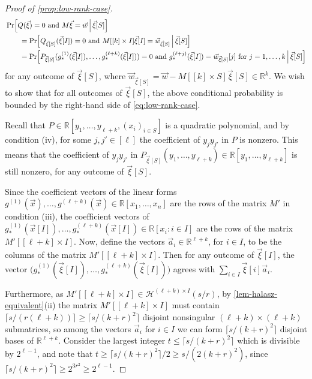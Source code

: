 \documentclass[english]{article}
\theoremstyle{remark}
\numberwithin{equation}{section}
\numberwithin{figure}{section}
\newcommand{\RR}{\mathbb{R}}
\begin{document}
\begin{proof}[Proof of \cref{prop:low-rank-case}]
\begin{align*}
&\Pr\Bigl[Q(\vec \xi)=0\text{ and }M\vec{\xi}=\vec{w}\,\Big|\,\vec \xi[S]\Bigr]\\
&\qquad =\Pr\Bigl[Q_{\vec \xi[S]}(\vec \xi[I])=0\text{ and }M[[k]\times I]\vec{\xi}[I]=\vec{w}_{\vec \xi[S]}\,\Big|\,\vec \xi[S]\Bigr]\\
&\qquad =\Pr\Bigl[P_{\vec \xi[S]}(g^{(1)}_{*}(\vec{\xi}[I]),\dots,g^{({\ell+k})}_{*}(\vec{\xi}[I]))=0\text{ and }g^{({\ell+j})}_{*}(\vec{\xi}[I])=\vec{w}_{\vec \xi[S]}[j]\text{ for }j=1,\dots,k\,\Big|\,\vec \xi[S]\Bigr]
\end{align*}
for any outcome of $\vec \xi[S]$, where $\vec{w}_{\vec \xi[S]}=\vec{w}-M[[k]\times S]\vec{\xi}[S]\in \RR^k$.
We wish to show that for all outcomes of $\vec \xi[S]$, the above conditional probability is bounded by the right-hand side of \cref{eq:low-rank-case}.

Recall that $P\in \mathbb{R}[y_1,\dots,y_{\ell+k}, (x_i)_{i\in S}]$ is a quadratic polynomial, and by condition (iv), for some $j,j'\in [\ell]$ the coefficient of $y_j y_{j'}$ in $P$ is nonzero. This means that the coefficient of $y_jy_{j'}$ in $P_{\vec \xi[S]}(y_1,\dots,y_{\ell+k})\in \mathbb{R}[y_1,\dots,y_{\ell+k}]$ is still nonzero, for any outcome of $\vec \xi[S]$.

Since the coefficient vectors of the linear forms $g^{(1)}(\vec x),\dots,g^{({\ell+k})}(\vec x)\in \RR[x_1,\dots,x_n]$ are the rows of the matrix $M'$ in condition (iii), the coefficient vectors of $g^{(1)}_{*}(\vec x[I]),\dots,g^{({\ell+k})}_{*}(\vec x[I])\in \RR[x_i: i\in I]$ are the rows of the matrix $M'[[\ell+k]\times I]$. Now, define the vectors $\vec{a}_i\in \mathbb{R}^{\ell+k}$, for $i\in I$, to be the columns of the matrix $M'[[\ell+k]\times I]$. Then for any outcome of $\vec{\xi}[I]$, the vector $\bigl(g^{(1)}_{*}(\vec{\xi}[I]),\dots,g^{({\ell+k})}_{*}(\vec{\xi}[I])\bigr)$ agrees with $\sum_{i\in I} \vec{\xi}[i]\vec{a}_i$.

Furthermore, as $M'[[\ell+k]\times I]\in \mathcal{H}^{(\ell+k)\times I}(s/r)$, by \cref{lem-halasz-equivalent}(ii) the matrix $M'[[\ell+k]\times I]$ must contain $\lceil s/(r(\ell+k))\rceil\ge \lceil s/(k+r)^2\rceil$ disjoint nonsingular $(\ell+k)\times (\ell+k)$ submatrices, so among the vectors $\vec{a}_i$ for $i\in I$ we can form $\lceil s/(k+r)^2\rceil$ disjoint bases of $\mathbb{R}^{\ell+k}$. Consider the largest integer $t\le \lceil s/(k+r)^2\rceil$ which is divisible by $2^{\ell-1}$, and note that $t\ge \lceil s/(k+r)^2\rceil/2\ge s/(2(k+r)^2)$, since $\lceil s/(k+r)^2\rceil\ge 2^{3r^2}\ge 2^{\ell-1}$.


\end{proof}
\end{document}
